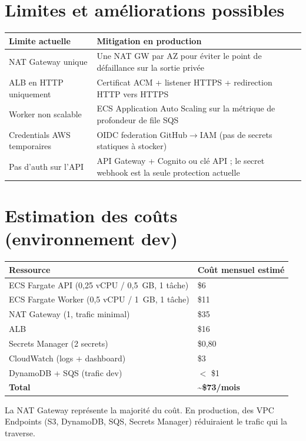 \documentclass[11pt,a4paper]{article}
\begin{document}
\section{Limites et am\'{e}liorations possibles}

\begin{tabularx}{\linewidth}{lX}
\toprule
Limite actuelle & Mitigation en production \\
\midrule
NAT Gateway unique & Une NAT GW par AZ pour \'{e}viter le point de d\'{e}faillance sur la sortie priv\'{e}e \\
ALB en HTTP uniquement & Certificat ACM + listener HTTPS + redirection HTTP vers HTTPS \\
Worker non scalable & ECS Application Auto Scaling sur la m\'{e}trique de profondeur de file SQS \\
Credentials AWS temporaires & OIDC federation GitHub$\to$IAM (pas de secrets statiques \`{a} stocker) \\
Pas d'auth sur l'API & API Gateway + Cognito ou cl\'{e} API ; le secret webhook est la seule protection actuelle \\
\bottomrule
\end{tabularx}

\section{Estimation des co\^{u}ts (environnement dev)}

\begin{tabularx}{\linewidth}{lX}
\toprule
Ressource & Co\^{u}t mensuel estim\'{e} \\
\midrule
ECS Fargate API (0,25 vCPU / 0,5~GB, 1 t\^{a}che) & \$6 \\
ECS Fargate Worker (0,5 vCPU / 1~GB, 1 t\^{a}che) & \$11 \\
NAT Gateway (1, trafic minimal) & \$35 \\
ALB & \$16 \\
Secrets Manager (2 secrets) & \$0,80 \\
CloudWatch (logs + dashboard) & \$3 \\
DynamoDB + SQS (trafic dev) & $<$ \$1 \\
\midrule
\textbf{Total} & \textbf{\textasciitilde\$73/mois} \\
\bottomrule
\end{tabularx}

La NAT Gateway repr\'{e}sente la majorit\'{e} du co\^{u}t. En production, des VPC Endpoints (S3, DynamoDB, SQS, Secrets Manager) r\'{e}duiraient le trafic qui la traverse.
\end{document}
